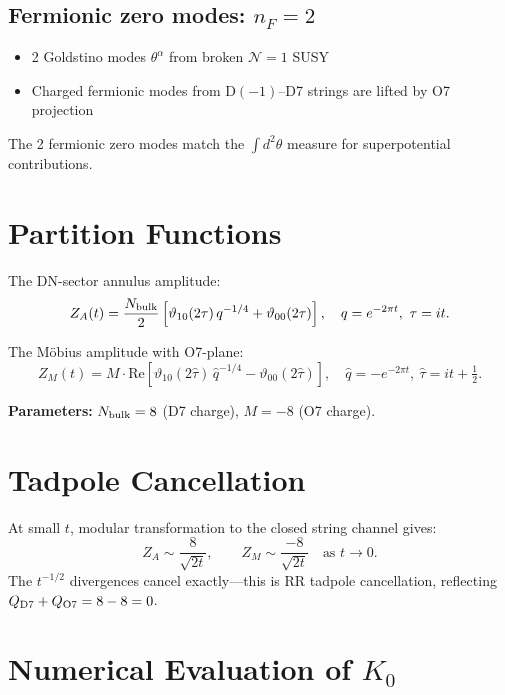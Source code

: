 \documentclass[11pt]{article}
\begin{document}
\subsection{Fermionic zero modes: $n_F = 2$}
\begin{itemize}
\item 2 Goldstino modes $\theta^\alpha$ from broken $\mathcal{N}=1$ SUSY
\item Charged fermionic modes from D$(-1)$--D7 strings are lifted by O7 projection
\end{itemize}
The 2 fermionic zero modes match the $\int d^2\theta$ measure for superpotential contributions.

\section{Partition Functions}

The DN-sector annulus amplitude:
\begin{equation}
Z_A(t) = \frac{N_{\rm bulk}}{2}\left[\vartheta_{10}(2\tau)\, q^{-1/4} + \vartheta_{00}(2\tau)\right], \quad q = e^{-2\pi t},\ \tau = it.
\end{equation}

The M\"obius amplitude with O7-plane:
\begin{equation}
Z_M(t) = M \cdot \text{Re}\left[\vartheta_{10}(2\hat\tau)\, \hat{q}^{-1/4} - \vartheta_{00}(2\hat\tau)\right], \quad \hat{q} = -e^{-2\pi t},\ \hat\tau = it + \tfrac{1}{2}.
\end{equation}

\textbf{Parameters:} $N_{\rm bulk} = 8$ (D7 charge), $M = -8$ (O7 charge).

\section{Tadpole Cancellation}

At small $t$, modular transformation to the closed string channel gives:
\begin{equation}
Z_A \sim \frac{8}{\sqrt{2t}}, \qquad Z_M \sim \frac{-8}{\sqrt{2t}} \quad \text{as } t \to 0.
\end{equation}
The $t^{-1/2}$ divergences cancel exactly---this is RR tadpole cancellation, reflecting $Q_{\rm D7} + Q_{\rm O7} = 8 - 8 = 0$.

\section{Numerical Evaluation of $K_0$}
\end{document}
